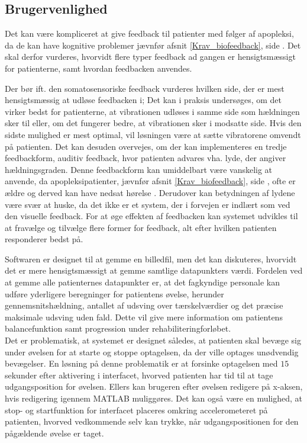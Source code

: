 \subsection{Brugervenlighed}
Det kan være kompliceret at give feedback til patienter med følger af apopleksi, da de kan have kognitive problemer jævnfør afsnit \ref{Krav_biofeedback}, side \pageref{Krav_biofeedback}. Det skal derfor vurderes, hvorvidt flere typer feedback ad gangen er hensigtsmæssigt for patienterne, samt hvordan feedbacken anvendes.  

Der bør ift. den somatosensoriske feedback vurderes hvilken side, der er mest hensigtsmæssig at udløse feedbacken i; Det kan i praksis undersøges, om det virker bedst for patienterne, at vibrationen udløses i samme side som hældningen sker til eller, om det fungerer bedre, at vibrationen sker i modsatte side. Hvis den sidste mulighed er mest optimal, vil løsningen være at sætte vibratorene omvendt på patienten. Det kan desuden overvejes, om der kan implementeres en tredje feedbackform, auditiv feedback, hvor patienten advares vha. lyde, der angiver hældningsgraden. Denne feedbackform kan umiddelbart være vanskelig at anvende, da apopleksipatienter, jævnfør afsnit \ref{Krav_biofeedback}, side \pageref{Krav_biofeedback}, ofte er ældre og derved kan have nedsat hørelse \cite{Sundhedsstyrelsen2011}. Derudover kan betydningen af lydene være svær at huske, da det ikke er et system, der i forvejen er indlært som ved den visuelle feedback. For at øge effekten af feedbacken kan systemet udvikles til at fravælge og tilvælge flere former for feedback, alt efter hvilken patienten responderer bedst på.

Softwaren er designet til at gemme en billedfil, men det kan diskuteres, hvorvidt det er mere hensigtsmæssigt at gemme samtlige datapunkters værdi. Fordelen ved at gemme alle patienternes datapunkter er, at det fagkyndige personale kan udføre yderligere beregninger for patientens øvelse, herunder gennemsnitshældning, antallet af udsving over tærskelværdier og det præcise maksimale udsving uden fald. Dette vil give mere information om patientens balancefunktion samt progression under rehabiliteringforløbet. \\
Det er problematisk, at systemet er designet således, at patienten skal bevæge sig under øvelsen for at starte og stoppe optagelsen, da der ville optages unødvendig bevægelser. En løsning på denne problematik er at forsinke optagelsen med $15$ sekunder efter aktivering i interfacet, hvorved patienten har tid til at tage udgangsposition for øvelsen. Ellers kan brugeren efter øvelsen redigere på x-aksen, hvis redigering igennem MATLAB muliggøres. Det kan også være en mulighed, at stop- og startfunktion for interfacet placeres omkring accelerometeret på patienten, hvorved vedkommende selv kan trykke, når udgangspositionen for den pågældende øvelse er taget.

